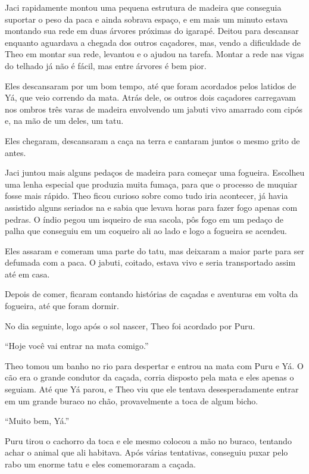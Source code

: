 Jaci rapidamente montou uma pequena estrutura de madeira que conseguia
suportar o peso da paca e ainda sobrava espaço, e em mais um minuto
estava montando sua rede em duas árvores próximas do igarapé. Deitou
para descansar enquanto aguardava a chegada dos outros caçadores, mas, vendo
a dificuldade de Theo em montar sua rede, levantou e o ajudou na
tarefa. Montar a rede nas vigas do telhado já não é fácil, mas entre árvores é
bem pior.

Eles descansaram por um bom tempo, até que foram acordados pelos latidos de
Yá, que veio correndo da mata. Atrás dele, os outros dois caçadores
carregavam nos ombros três varas de madeira envolvendo um jabuti vivo
amarrado com cipós e, na mão de um deles, um tatu.

Eles chegaram, descansaram a caça na terra e cantaram juntos o mesmo
grito de antes.

Jaci juntou mais alguns pedaços de madeira para começar uma fogueira.
Escolheu uma lenha especial que produzia muita fumaça, para que o
processo de muquiar fosse mais rápido. Theo ficou curioso sobre como
tudo iria acontecer, já havia assistido alguns seriados na  e sabia
que levava horas para fazer fogo apenas com pedras. O índio pegou um
isqueiro de sua sacola, pôs fogo em um pedaço de palha que conseguiu em
um coqueiro ali ao lado e logo a fogueira se acendeu.

Eles assaram e comeram uma parte do tatu, mas deixaram a maior parte para ser
defumada com a paca. O jabuti, coitado, estava vivo e seria transportado
assim até em casa.

Depois de comer, ficaram contando histórias de caçadas e aventuras em
volta da fogueira, até que foram dormir.

No dia seguinte, logo após o sol nascer, Theo foi acordado por Puru.

``Hoje você vai entrar na mata comigo.''

Theo tomou um banho no rio para despertar e entrou na mata com Puru e
Yá. O cão era o grande condutor da caçada, corria disposto pela mata e
eles apenas o seguiam. Até que Yá parou, e Theo viu que ele tentava
desesperadamente entrar em um grande buraco no chão, provavelmente a
toca de algum bicho.

``Muito bem, Yá.''

Puru tirou o cachorro da toca e ele mesmo colocou a mão no buraco,
tentando achar o animal que ali habitava. Após várias tentativas,
conseguiu puxar pelo rabo um enorme tatu e eles comemoraram a caçada.


